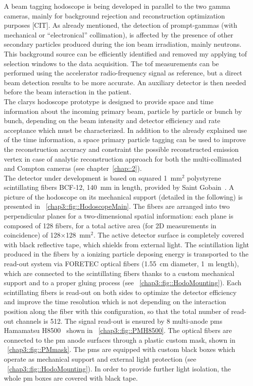 A beam tagging hodoscope is being developed in parallel to the two gamma cameras, mainly for background rejection and reconstruction optimization purposes [CIT]. As already mentioned, the detection of prompt-gammas (with mechanical or \enquote{electronical} collimation), is affected by the presence of other secondary particles produced during the ion beam irradiation, mainly neutrons. This background source can be efficiently identified and removed my applying \gls{tof} selection windows to the data acquisition. The \gls{tof} measurements can be performed using the accelerator radio-frequency signal as reference, but a direct beam detection results to be more accurate. An auxiliary detector is then needed before the beam interaction in the patient.\\ 
The \gls{clarys} hodoscope prototype is designed to provide space and time information about the incoming primary beam, particle by particle or bunch by bunch, depending on the beam intensity and detector efficiency and rate acceptance which must be characterized. In addition to the already explained use of the time information, a space primary particle tagging can be used to improve the reconstruction accuracy and constraint the possible reconstructed emission vertex in case of analytic reconstruction approach for both the multi-collimated and Compton cameras (see chapter~\ref{chap::2}).\\  
The detector under development is based on squared 1~mm$^{2}$ polystyrene scintillating fibers BCF-12, 140~mm in length, provided by Saint Gobain~\parencite{SaintGobain2017}. A picture of the hodoscope on its mechanical support (detailed in the following) is presented in \figurename~\ref{chap3::fig::HodoscopeMain}. The fibers are arranged into two perpendicular planes for a two-dimensional spatial information: each plane is composed of 128 fibers, for a total active area (for 2D measurements in coincidence) of 128$\times$128~mm$^{2}$. The active detector surface is completely covered with black reflective tape, which shields from external light. The scintillation light produced in the fibers by a ionizing particle deposing energy is transported to the read-out system via FORETEC optical fibers (1.55~cm diameter, 1~m length), which are connected to the scintillating fibers thanks to a custom mechanical support and to a proper gluing process (see \figurename~\ref{chap3::fig::HodoMounting}). Each scintillating fibers is read-out on both sides to optimize the detector efficiency and improve the time resolution which is not depending on the interaction position along the fiber with this configuration, so that the total number of read-out channels is 512. The signal read-out is ensured by 8 multi-anode \glspl{pm} Hamamatsu H8500~\parencite{Hamamatsu2006} shown in \figurename~\ref{chap3::fig::PMH8500}. The optical fibers are connected to the \gls{pm} anode surfaces through a plastic custom mask, shown in \figurename~\ref{chap3::fig::PMmask}. The \glspl{pm} are equipped with custom black boxes which operate as mechanical support and external light protection (see \figurename~\ref{chap3::fig::HodoMounting}). In order to provide further light isolation, the whole \gls{pm} boxes are covered with black tape.\\

